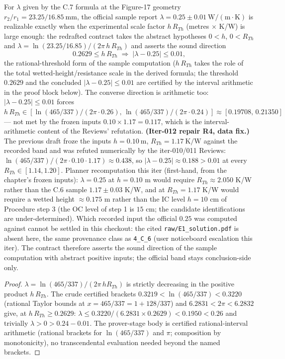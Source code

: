\begin{theorem}
\label{thm:IPhO2026Problems_problem_IPhO_2026_4_C_7:acrylicConductivity_officialSample}
For $\lambda$ given by the C.7 formula at the Figure-17 geometry
$r_2/r_1 = 23.25/16.85\ \mathrm{mm}$, the official sample report
$\lambda = 0.25 \pm 0.01\ \mathrm{W/(m\cdot K)}$ is realizable exactly
when the experimental scale factor $h\,R_{Th}$ (metres $\times$ K/W) is
large enough: the redrafted contract takes the abstract hypotheses
$0 < h$, $0 < R_{Th}$ and
$\lambda = \ln(23.25/16.85)/(2\pi\, h\, R_{Th})$ and asserts the sound
direction
\[ 0.2629 \le h\,R_{Th}
  \;\Longrightarrow\;
  \bigl|\lambda - 0.25\bigr| \le 0.01,
\]
the rational-threshold form of the sample computation ($h\,R_{Th}$ takes
the role of the total wetted-height/resistance scale in the derived
formula; the threshold $0.2629$ and the concluded $|\lambda-0.25|\le0.01$
are certified by the interval arithmetic in the proof block below).  The
converse direction is arithmetic too: $|\lambda - 0.25| \le 0.01$ forces
$h\,R_{Th} \in [\ln(465/337)/(2\pi\cdot0.26),\,
\ln(465/337)/(2\pi\cdot0.24)] \approx [0.19708,\, 0.21350]$ --- not
met by the frozen inputs $0.10 \times 1.17 = 0.117$, which is the
interval-arithmetic content of the Reviews' refutation.
\textbf{(Iter-012 repair R4, data fix.)}  The previous draft froze the
inputs $h = 0.10\ \mathrm{m}$, $R_{Th} = 1.17\ \mathrm{K/W}$ against the
recorded band and was refuted numerically by the iter-010/011 Reviews:
$\ln(465/337)/(2\pi\cdot 0.10\cdot 1.17) \approx 0.438$, so
$|\lambda - 0.25| \approx 0.188 > 0.01$ at every
$R_{Th} \in [1.14, 1.20]$.  Planner recomputation this iter (first-hand,
from the chapter's frozen inputs): $\lambda = 0.25$ at $h = 0.10$ m would
require $R_{Th} \approx 2.050$ K/W rather than the C.6 sample
$1.17 \pm 0.03$ K/W, and at $R_{Th} = 1.17$ K/W would require a wetted
height $\approx 0.175$ m rather than the IC level $h = 10$ cm of Procedure
step 3 (the OC level of step 1 is $15$ cm; the candidate identifications
are under-determined).  Which recorded input the official $0.25$ was
computed against cannot be settled in this checkout: the cited
\texttt{raw/E1\_solution.pdf} is absent here, the same provenance class
as \texttt{4\_C\_6} (user noticeboard escalation this iter).  The
contract therefore asserts the sound direction of the sample computation
with abstract positive inputs; the official band stays conclusion-side
only.
\end{theorem}
\begin{proof}
$\lambda = \ln(465/337)/(2\pi\, h R_{Th})$ is strictly decreasing in the
positive product $h\,R_{Th}$.  The crude certified brackets
$0.3219 < \ln(465/337) < 0.3220$ (rational Taylor bounds at
$x = 465/337 = 1 + 128/337$) and $6.2831 < 2\pi < 6.2832$ give, at
$h\,R_{Th} \ge 0.2629$:
$\lambda \le 0.3220/(6.2831 \times 0.2629) < 0.1950 < 0.26$ and trivially
$\lambda > 0 > 0.24 - 0.01$.
The prover-stage body is certified rational-interval arithmetic
(rational brackets for $\ln(465/337)$ and $\pi$; composition by
monotonicity), no transcendental evaluation needed beyond the named
brackets.
\end{proof}
